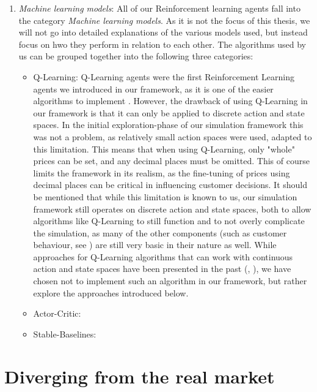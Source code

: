\begin{enumerate}
	\item \emph{Machine learning models}: All of our Reinforcement learning agents fall into the category \emph{Machine learning models}. As it is not the focus of this thesis, we will not go into detailed explanations of the various models used, but instead focus on hwo they perform in relation to each other. The algorithms used by us can be grouped together into the following three categories:
	      \begin{itemize}
		      \item Q-Learning: Q-Learning agents were the first Reinforcement Learning agents we introduced in our framework, as it is one of the easier algorithms to implement \cite{reinforcementLearningOverview}. However, the drawback of using Q-Learning in our framework is that it can only be applied to discrete action and state spaces. In the initial exploration-phase of our simulation framework this was not a problem, as relatively small action spaces were used, adapted to this limitation. This means that when using Q-Learning, only "whole" prices can be set, and any decimal places must be omitted. This of course limits the framework in its realism, as the fine-tuning of prices using decimal places can be critical in influencing customer decisions. It should be mentioned that while this limitation is known to us, our simulation framework still operates on discrete action and state spaces, both to allow algorithms like Q-Learning to still function and to not overly complicate the simulation, as many of the other components (such as customer behaviour, see ) are still very basic in their nature as well. While approaches for Q-Learning algorithms that can work with continuous action and state spaces have been presented in the past (\cite{QLearningContinuous}, \cite{QLearningContinuous2}), we have chosen not to implement such an algorithm in our framework, but rather explore the approaches introduced below.
		      \item Actor-Critic:
		      \item Stable-Baselines:
	      \end{itemize}
\end{enumerate}


\section{Diverging from the real market}

